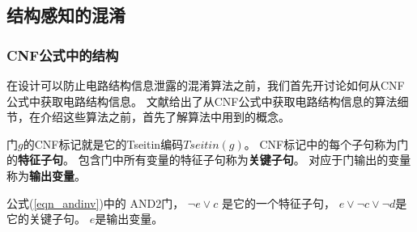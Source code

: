 \subsection{结构感知的混淆}\label{obfuscating}
\subsubsection{CNF公式中的结构}\label{CNF structure}
在设计可以防止电路结构信息泄露的混淆算法之前，我们首先开讨论如何从CNF公式中获取电路结构信息。
文献\cite{csRoy,csFu}给出了从CNF公式中获取电路结构信息的算法细节，在介绍这些算法之前，首先了解算法中用到的概念。
%
\begin{definition}[CNF标记]
门$g$的CNF标记就是它的Tseitin编码$Tseitin(g)$。
CNF标记中的每个子句称为门的\textbf{特征子句}。
包含门中所有变量的特征子句称为\textbf{关键子句}。
对应于门输出的变量称为\textbf{输出变量}。
\end{definition}

%

公式(\ref{eqn_andinv})中的 AND2门，
$\neg e\vee c$ 是它的一个特征子句，
$e\vee \neg c\vee\neg d$是它的关键子句。
$e$是输出变量。


